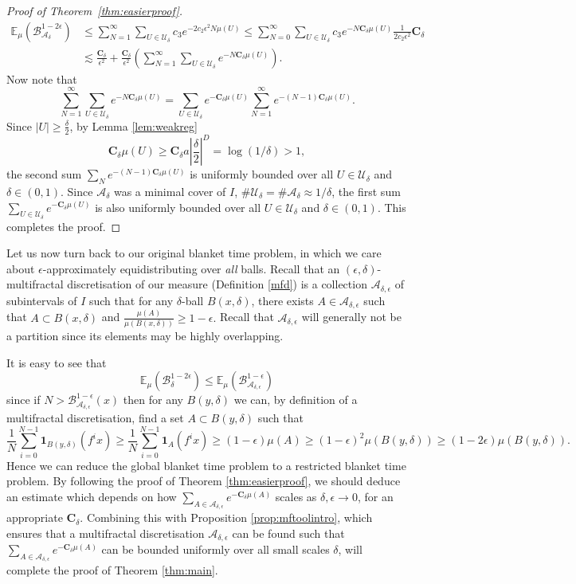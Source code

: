 \documentclass[11pt, reqno]{amsart}
\numberwithin{equation}{section}
\theoremstyle{plain}%
\theoremstyle{definition}
\def\U{\ensuremath{\mathcal U}}
\def\B{\ensuremath{\mathcal B}}
\def\A{\ensuremath{\mathscr A}}
\renewcommand{\A}{\mathcal{A}}
\renewcommand{\U}{\mathcal{U}}
\theoremstyle{nonumberplain}
\begin{document}
\begin{proof}[Proof of Theorem~\ref{thm:easierproof}]
\begin{align*}
\mathbb{E}_\mu(\B_{\A_\delta}^{1-2{\epsilon}}) &\leq \sum_{N=1}^\infty \sum_{U \in \U_\delta} c_3e^{-2c_2\epsilon^2N \mu(U)}\leq  \sum_{N=0}^\infty \sum_{U \in \U_\delta} c_3 e^{-N \mathbf{C}_\delta \mu(U)} \frac{1}{2c_2\epsilon^2} \mathbf{C}_\delta\\
&\lesssim \frac{ \mathbf{C}_\delta}{\epsilon^2}+ \frac{ \mathbf{C}_\delta}{\epsilon^2} \left( \sum_{N=1}^\infty \sum_{U \in \U_\delta}e^{-N \mathbf{C}_\delta \mu(U)}\right).
\end{align*}
Now note that
$$ \sum_{N=1}^\infty \sum_{U \in \U_\delta}e^{-N \mathbf{C}_\delta \mu(U)}= \sum_ {U \in \U_\delta} e^{-\mathbf{C}_\delta \mu(U)} \sum_{N=1}^{\infty} e^{-(N-1)\mathbf{C}_\delta \mu(U)}.$$
Since $|U| \geq \frac{\delta}{2}$, by Lemma \ref{lem:weakreg} 
$$\mathbf{C}_\delta\mu(U) \geq\mathbf{C}_\delta a \left|\frac{\delta}{2}\right|^{D}=\log(1/\delta)>1,$$
the second sum $\sum_N e^{-(N-1)\mathbf{C}_\delta\mu(U)}$ is uniformly bounded over all $U \in \U_\delta$ and $\delta \in(0,1)$. Since $\A_\delta$ was a minimal cover of $I$, $\#\U_\delta =\#\A_\delta\approx 1/\delta$, the first sum $\sum_ {U \in \U_\delta} e^{-\mathbf{C}_\delta\mu(U)}$ is also uniformly bounded over all $U \in \U_\delta$ and $\delta \in(0,1)$. This completes the proof.
\end{proof}

Let us now turn back to our original blanket time problem, in which we care about $\epsilon$-approximately equidistributing over \emph{all} balls. Recall that an $(\epsilon,\delta)$-multifractal discretisation of our measure (Definition \ref{mfd}) is a collection $\A_{\delta,\epsilon}$ of subintervals of $I$ such that for any $\delta$-ball $B(x,\delta)$, there exists $A \in \A_{\delta, \epsilon}$ such that $A \subset B(x,\delta)$ and $\frac{\mu(A)}{\mu(B(x,\delta))} \geq 1-\epsilon.$ Recall that $\A_{\delta,\epsilon}$ will generally not be a partition since its elements may be highly overlapping.

It is easy to see that 
$$ \mathbb{E}_\mu(\B_\delta^{1-2\epsilon}) \leq \mathbb{E}_\mu(\B_{\A_{\delta,\epsilon}}^{1-\epsilon})$$
since if $N>\mathcal{B}_{\A_{\delta,\epsilon}}^{1-\epsilon}(x)$ then for any $B(y,\delta)$ we can, by definition of a multifractal discretisation, find a set $A \subset B(y,\delta)$ such that
$$\frac{1}{N} \sum_{i=0}^{N-1} \mathbf{1}_{B(y,\delta)}(f^ix) \geq \frac{1}{N} \sum_{i=0}^{N-1} \mathbf{1}_A(f^ix) \geq (1-\epsilon)\mu(A) \geq (1-\epsilon)^2\mu(B(y,\delta))\geq (1-2\epsilon)\mu(B(y,\delta)).$$
Hence we can reduce the global blanket time problem to a restricted blanket time problem. By following the proof of Theorem \ref{thm:easierproof}, we should deduce an estimate which depends on how $\sum_ {A\in \A_{\delta,\epsilon}} e^{-\mathbf{C}_\delta\mu(A)}$ scales as $\delta,\epsilon \to 0$, for an appropriate $\mathbf{C}_\delta$. Combining this with Proposition \ref{prop:mftoolintro}, which ensures that a multifractal discretisation $\A_{\delta,\epsilon}$ can be found such that $\sum_ {A\in \A_{\delta,\epsilon}} e^{-\mathbf{C}_\delta\mu(A)}$ can be bounded uniformly over all small scales $\delta$, will complete the proof of Theorem \ref{thm:main}.
\end{document}
